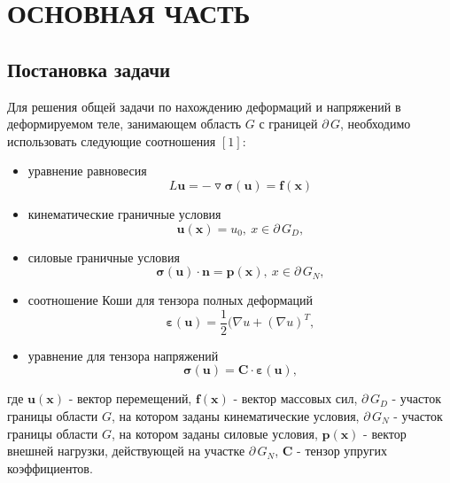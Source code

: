 \documentclass[a4paper]{article}
\begin{document}
\newpage
 
\section{ОСНОВНАЯ ЧАСТЬ}

\subsection{Постановка задачи}

Для решения общей задачи по нахождению деформаций и напряжений в деформируемом теле, занимающем область $G$ с границей $\partial \, G$, необходимо использовать следующие соотношения $\left[1\right]$:

\begin{itemize}

\item уравнение равновесия
\begin{equation}
L \mathbf{u} = - \triangledown \bm{\sigma(u)} = \mathbf{f(x)}
\end{equation}

\item кинематические граничные условия
\begin{equation}
\bm{u(x)} = u_0, \ x \in \partial \, G_D,
\end{equation}

\item силовые граничные условия
\begin{equation}
\bm{\sigma}\mathbf{(u) \cdot n} = \mathbf{p(x)}, \ x \in \partial \, G_N,
\end{equation}

\item соотношение Коши для тензора полных деформаций
\begin{equation}
\bm{\varepsilon(u)}=\dfrac{1}{2}(\nabla u + (\nabla u)^T,
\end{equation}

\item уравнение для тензора напряжений
\begin{equation}
\bm{\sigma(u)} = \mathbf{C \cdot} \bm{\varepsilon}\mathbf{(u)},
\end{equation}
\end{itemize}

где $\mathbf{u(x)}$ - вектор перемещений, $\mathbf{f(x)}$ - вектор массовых сил, $\partial \, G_D$ - участок границы области $G$, на котором заданы кинематические условия, $\partial \, G_N$ - участок границы области $G$, на котором заданы силовые условия, $\mathbf{p(x)}$ - вектор внешней нагрузки, действующей на участке $\partial \, G_N$, $\mathbf{C}$ - тензор упругих коэффициентов. 
\end{document}
